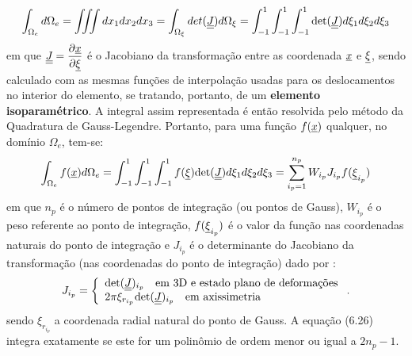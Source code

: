 \begin{equation}
	\label{eq:troca_variavel_integral_volume}
	\int_{\Omega_e}d\Omega_e = \iiint dx_1 dx_2 dx_3 = \int_{\Omega_\xi}det(\underline{\underline J})d\Omega_\xi = \int_{-1}^{1}\int_{-1}^{1}\int_{-1}^{1}\text{det}(\underline{\underline J})d\xi_1d\xi_2d\xi_3
\end{equation}
em que $\underline{\underline J} = \dfrac{\partial \underline x}{\partial \underline{\xi}}$  é o Jacobiano da transformação entre as coordenada $\underline x$ e $\underline{\xi}$, sendo calculado com as mesmas funções de interpolação usadas para os deslocamentos no interior do elemento, se tratando, portanto, de um \textbf{elemento isoparamétrico}. A integral assim representada é então resolvida pelo método da Quadratura de Gauss-Legendre. Portanto, para uma função $f(\underline x)$ qualquer, no domínio $\Omega_e$, tem-se:
\begin{equation}
	\label{eq:troca_variavel_integral_volume}
	\int_{\Omega_e}f(\underline x)d\Omega_e = \int_{-1}^{1}\int_{-1}^{1}\int_{-1}^{1}f(\underline{\xi})\text{det}(\underline{\underline J})d\xi_1d\xi_2d\xi_3 = \sum_{i_p=1}^{n_p}W_{i_p}J_{i_p}f(\underline{\xi}_{i_p})
\end{equation}
em que $n_p$ é o número de pontos de integração (ou pontos de Gauss), $W_{i_p}$ é o peso referente ao ponto de integração, $f(\underline{\xi}_{i_p})$ é o valor da função nas coordenadas naturais do ponto de integração e $J_{i_p}$ é o determinante do Jacobiano da transformação (nas coordenadas do ponto de integração) dado por \cite[p. 206-207]{Zienkiewicz2005}:
\begin{equation}
	\label{eq:jacobiano_transformacao}
	J_{i_p} = \left\{
	\begin{array}{lcl}
		 \text{det}(\underline{\underline J})_{i_p}~~~\text{em 3D e estado plano de deformações} \\
		2\pi\xi_{r_{i_p}}\text{det}(\underline{\underline J})_{i_p} ~~~\text{em axissimetria}
	\end{array}
\right..
\end{equation}
sendo $\xi_{r_{i_p}}$ a coordenada radial natural do ponto de Gauss. A equação (6.26) integra  exatamente se este for um polinômio de ordem menor ou igual a $2n_p-1$.

